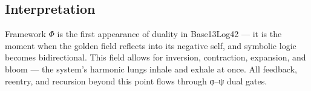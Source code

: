 \subsection*{Interpretation}

Framework $\Phi$ is the first appearance of duality in Base13Log42 — it is the moment when the golden field reflects into its negative self, and symbolic logic becomes bidirectional. This field allows for inversion, contraction, expansion, and bloom — the system’s harmonic lungs inhale and exhale at once. All feedback, reentry, and recursion beyond this point flows through φ–ψ dual gates.

